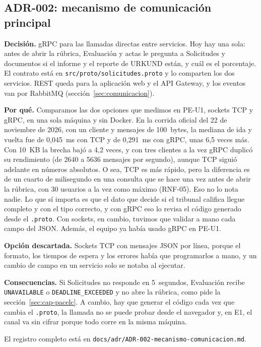 \subsection{ADR-002: mecanismo de comunicación principal}

\textbf{Decisión.} gRPC para las llamadas directas entre servicios. Hoy hay una sola: antes de abrir la rúbrica, Evaluación y actas le pregunta a Solicitudes y documentos si el informe y el reporte de URKUND están, y cuál es el porcentaje. El contrato está en \nolinkurl{src/proto/solicitudes.proto} y lo comparten los dos servicios. REST queda para la aplicación web y el API Gateway, y los eventos van por RabbitMQ (sección~\ref{sec:comunicacion}).

\textbf{Por qué.} Comparamos las dos opciones que medimos en PE-U1, sockets TCP y gRPC, en una sola máquina y sin Docker. En la corrida oficial del 22 de noviembre de 2026, con un cliente y mensajes de 100~bytes, la mediana de ida y vuelta fue de 0,045~ms con TCP y de 0,291~ms con gRPC, unas 6,5 veces más. Con 10~KB la brecha bajó a 4,2 veces, y con tres clientes a la vez gRPC duplicó su rendimiento (de 2640 a 5636 mensajes por segundo), aunque TCP siguió adelante en números absolutos. O sea, TCP es más rápido, pero la diferencia es de un cuarto de milisegundo en una consulta que se hace una vez antes de abrir la rúbrica, con 30 usuarios a la vez como máximo (RNF-05). Eso no lo nota nadie. Lo que sí importa es que el dato que decide si el tribunal califica llegue completo y con el tipo correcto, y con gRPC eso lo revisa el código generado desde el \texttt{.proto}. Con sockets, en cambio, tuvimos que validar a mano cada campo del JSON. Además, el equipo ya había usado gRPC en PE-U1.

\textbf{Opción descartada.} Sockets TCP con mensajes JSON por línea, porque el formato, los tiempos de espera y los errores había que programarlos a mano, y un cambio de campo en un servicio solo se notaba al ejecutar.

\textbf{Consecuencias.} Si Solicitudes no responde en 5~segundos, Evaluación recibe \texttt{UNAVAILABLE} o \texttt{DEADLINE\_EXCEEDED} y no abre la rúbrica, como pide la sección~\ref{sec:cap-pacelc}. A cambio, hay que generar el código cada vez que cambia el \texttt{.proto}, la llamada no se puede probar desde el navegador y, en E1, el canal va sin cifrar porque todo corre en la misma máquina.

El registro completo está en \nolinkurl{docs/adr/ADR-002-mecanismo-comunicacion.md}.

